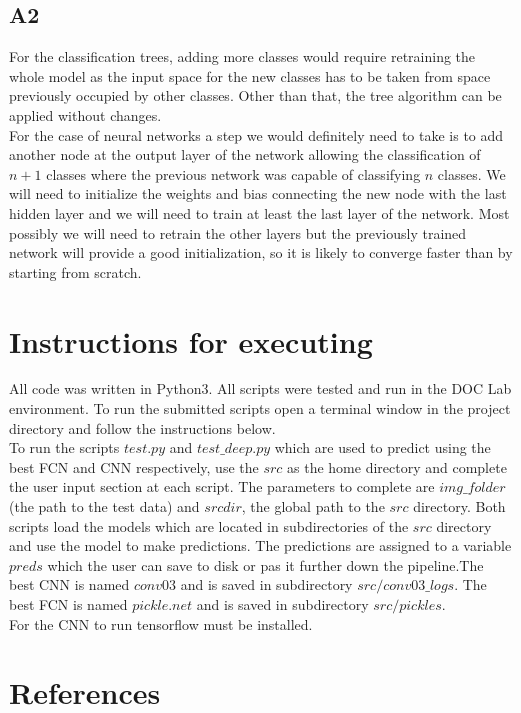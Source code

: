 \documentclass[12pt,twoside]{article}
\begin{document}
\subsection{A2}

For the classification trees, adding more classes would require retraining the whole model as the input space for the new classes has to be taken from space previously occupied by other classes. Other than that, the tree algorithm can be applied without changes.\\

For the case of neural networks a step we would definitely need to take is to add another node at the output layer of the network allowing the classification of $n+1$ classes where the previous network was capable of classifying $n$ classes. We will need to initialize the weights and bias connecting the new node with the last hidden layer and we will need to train at least the last layer of the network. Most possibly we will need to retrain the other layers but the previously trained network will provide a good initialization, so it is likely to converge faster than by starting from scratch.

\section{Instructions for executing}
All code was written in Python3. All scripts were tested and run in the DOC Lab environment. To run the submitted scripts open a terminal window in the project directory and follow the instructions below.\\

To run the scripts $test.py$ and $test\_deep.py$ which are used to predict using the best FCN and CNN respectively, use the $src$ as the home directory and complete the user input section at each script. The parameters to complete are $img\_folder$ (the path to the test data) and $srcdir$, the global path to the $src$ directory. Both scripts load the models which are located in subdirectories of the $src$ directory and use the model to make predictions. The predictions are assigned to a variable $preds$ which the user can save to disk or pas it further down the pipeline.The best CNN is named $conv03$ and is saved in subdirectory $src/conv03\_logs$. The best FCN is named $pickle.net$ and is saved in subdirectory $src/pickles$.\\

For the CNN to run tensorflow must be installed.


\section{References}
\end{document}
